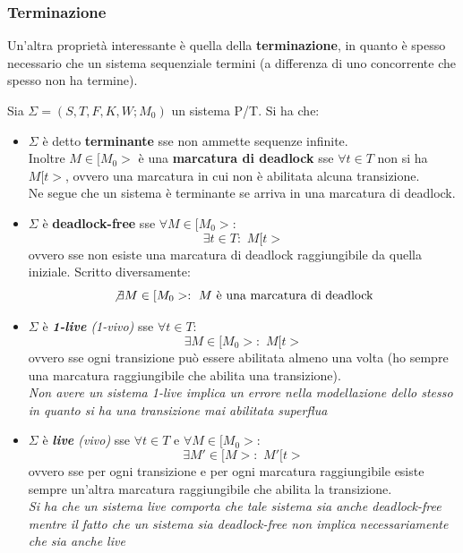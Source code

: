 \documentclass[a4paper,12pt, oneside]{book}
\begin{document}
\subsubsection{Terminazione}
Un'altra proprietà interessante è quella della \textbf{terminazione}, in quanto
è spesso necessario che un sistema sequenziale termini (a differenza di uno
concorrente che spesso non ha termine).
\begin{definizione}
  Sia $\Sigma=(S,T,F,K,W;M_0)$ un sistema P/T. Si ha che:
  \begin{itemize}
    \item $\Sigma$ è detto \textbf{terminante} sse non ammette sequenze
    infinite.\\
    Inoltre $M\in[M_0>$ è una \textbf{marcatura di deadlock} sse $\forall t\in
    T$ non si ha $M[t>$, ovvero una marcatura in cui non è abilitata alcuna
    transizione. \\
    Ne segue che un sistema è terminante se arriva in una marcatura di
    deadlock.\\
    \item $\Sigma$ è \textbf{deadlock-free} sse $\forall M\in[M_0>$:
    \[\exists t\in T:\,\, M[t>\]
    ovvero sse non esiste una marcatura di deadlock raggiungibile da quella
    iniziale. Scritto diversamente:
    \[\not\exists M\in[M_0>:\,\,M\mbox{ è una marcatura di deadlock}\]
    \item $\Sigma$ è \textit{\textbf{1-live} (1-vivo)} sse $\forall t\in T$:
    \[\exists M\in [M_0>:\,\,M[t>\]
    ovvero sse ogni transizione può essere abilitata almeno una volta (ho sempre
    una marcatura raggiungibile che abilita una transizione).\\
    \textit{Non avere un sistema 1-live implica un errore nella modellazione
      dello stesso in quanto si ha una transizione mai abilitata superflua}
    \item $\Sigma$ è \textit{\textbf{live} (vivo)} sse $\forall t\in T$ e
    $\forall M\in[M_0>$:
    \[\exists M'\in[M>:\,\,M'[t>\]
    ovvero sse per ogni transizione e per ogni marcatura raggiungibile esiste
    sempre un'altra marcatura raggiungibile che abilita la transizione.\\
    \textit{Si ha che un sistema \emph{live} comporta che tale sistema sia anche
      \emph{deadlock-free} mentre il fatto che un sistema sia
      \emph{deadlock-free} non implica necessariamente che sia anche
      \emph{live}} 
  \end{itemize}
\end{definizione}
\newpage
\end{document}
